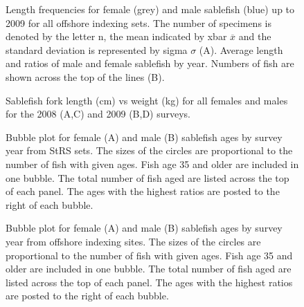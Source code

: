 \documentclass[12pt]{article}\usepackage[]{graphicx}\usepackage[]{color}
\begin{document}
\begin{figure}[htb]

{\centering {} 

}

\caption{Length frequencies for female (grey) and male sablefish (blue) up to 2009 for all offshore indexing sets. The number of specimens is denoted by the letter n, the mean indicated by xbar \(\overline{x}\) and the standard deviation is represented by sigma \(\sigma\) (A). Average length and ratios of male and female sablefish by year. Numbers of fish are shown across the top of the lines (B).}\label{fig:figure14}
\end{figure}
\clearpage


\begin{figure}[htb]

{\centering {} 

}

\caption{Sablefish fork length (cm) vs weight (kg) for all females and males for the 2008 (A,C) and 2009 (B,D) surveys.}\label{fig:figure15}
\end{figure}
\clearpage


\begin{figure}[htb]

{\centering {} 

}

\caption{Bubble plot for female (A) and male (B) sablefish ages by survey year from StRS sets. The sizes of the circles are proportional to the number of fish with given ages. Fish age 35 and older are included in one bubble. The total number of fish aged are listed across the top of each panel. The ages with the highest ratios are posted to the right of each bubble.}\label{fig:figure16}
\end{figure}
\clearpage


\begin{figure}[htb]

{\centering {} 

}

\caption{Bubble plot for female (A) and male (B) sablefish ages by survey year from offshore indexing sites. The sizes of the circles are proportional to the number of fish with given ages. Fish age 35 and older are included in one bubble. The total number of fish aged are listed across the top of each panel. The ages with the highest ratios are posted to the right of each bubble.}\label{fig:figure17}
\end{figure}
\clearpage
\end{document}
